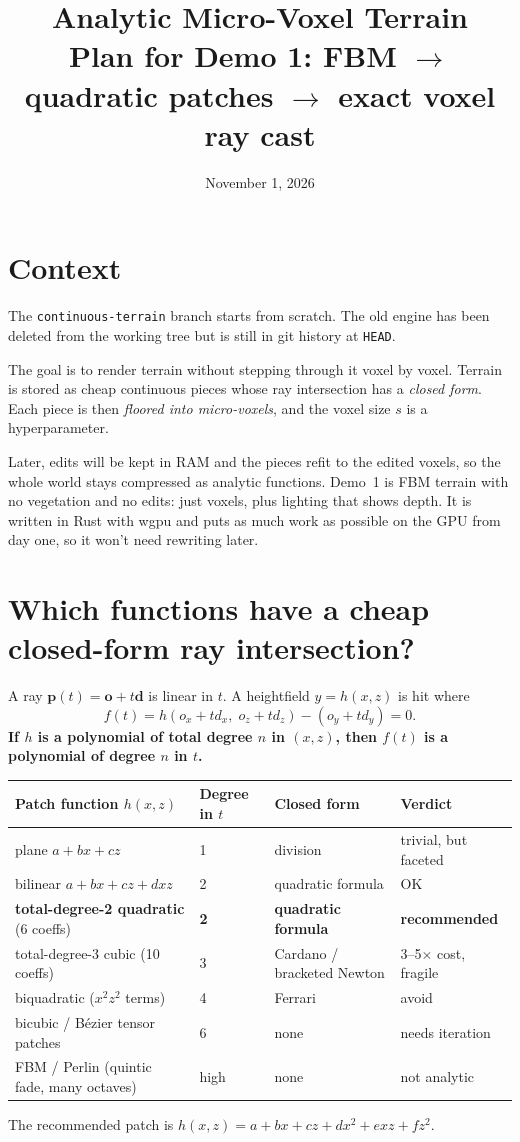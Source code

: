 \documentclass[11pt]{article}
\title{Analytic Micro-Voxel Terrain\\\large Plan for Demo 1: FBM $\rightarrow$ quadratic patches $\rightarrow$ exact voxel ray cast}
\date{November 1, 2026}
\begin{document}
\maketitle

\section*{Context}
The \texttt{continuous-terrain} branch starts from scratch. The old engine has been deleted from the working tree but is still in git history at \texttt{HEAD}.

The goal is to render terrain without stepping through it voxel by voxel. Terrain is stored as cheap continuous pieces whose ray intersection has a \emph{closed form}. Each piece is then \emph{floored into micro-voxels}, and the voxel size $s$ is a hyperparameter.

Later, edits will be kept in RAM and the pieces refit to the edited voxels, so the whole world stays compressed as analytic functions. Demo~1 is FBM terrain with no vegetation and no edits: just voxels, plus lighting that shows depth. It is written in Rust with wgpu and puts as much work as possible on the GPU from day one, so it won't need rewriting later.

\section{Which functions have a cheap closed-form ray intersection?}
A ray $\mathbf p(t)=\mathbf o+t\mathbf d$ is linear in $t$. A heightfield $y=h(x,z)$ is hit where
\[
f(t)=h(o_x+t d_x,\; o_z+t d_z)-(o_y+t d_y)=0 .
\]
\textbf{If $h$ is a polynomial of total degree $n$ in $(x,z)$, then $f(t)$ is a polynomial of degree $n$ in $t$.}

\begin{center}
\begin{tabular}{@{}llll@{}}
\toprule
Patch function $h(x,z)$ & Degree in $t$ & Closed form & Verdict\\
\midrule
plane $a+bx+cz$ & 1 & division & trivial, but faceted\\
bilinear $a+bx+cz+dxz$ & 2 & quadratic formula & OK\\
\textbf{total-degree-2 quadratic} (6 coeffs) & \textbf{2} & \textbf{quadratic formula} & \textbf{recommended}\\
total-degree-3 cubic (10 coeffs) & 3 & Cardano / bracketed Newton & 3--5$\times$ cost, fragile\\
biquadratic ($x^2z^2$ terms) & 4 & Ferrari & avoid\\
bicubic / B\'ezier tensor patches & 6 & none & needs iteration\\
FBM / Perlin (quintic fade, many octaves) & high & none & not analytic\\
\bottomrule
\end{tabular}
\end{center}
The recommended patch is $h(x,z)=a+bx+cz+dx^2+exz+fz^2$.
\end{document}
